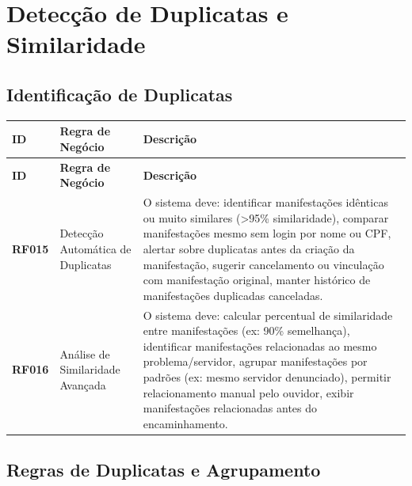 \documentclass[12pt,a4paper]{article}
\newcommand{\rf}[1]{\textbf{\color{primaryblue}RF#1}}
\begin{document}
\section{Detecção de Duplicatas e Similaridade}

\subsection{Identificação de Duplicatas}

\begin{longtable}{|p{2cm}|p{5cm}|p{8cm}|}
\hline
\textbf{ID} & \textbf{Regra de Negócio} & \textbf{Descrição} \\
\hline
\endfirsthead
\hline
\textbf{ID} & \textbf{Regra de Negócio} & \textbf{Descrição} \\
\hline
\endhead

\rf{015} & Detecção Automática de Duplicatas & O sistema deve: identificar manifestações idênticas ou muito similares (>95\% similaridade), comparar manifestações mesmo sem login por nome ou CPF, alertar sobre duplicatas antes da criação da manifestação, sugerir cancelamento ou vinculação com manifestação original, manter histórico de manifestações duplicadas canceladas. \\
\hline

\rf{016} & Análise de Similaridade Avançada & O sistema deve: calcular percentual de similaridade entre manifestações (ex: 90\% semelhança), identificar manifestações relacionadas ao mesmo problema/servidor, agrupar manifestações por padrões (ex: mesmo servidor denunciado), permitir relacionamento manual pelo ouvidor, exibir manifestações relacionadas antes do encaminhamento. \\
\hline

\end{longtable}

\subsection{Regras de Duplicatas e Agrupamento}
\end{document}
